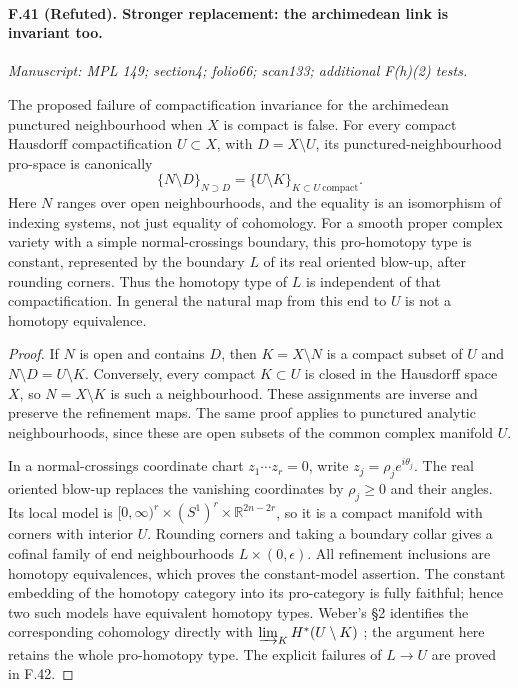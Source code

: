\paragraph{F.41 (Refuted). Stronger replacement: the archimedean link is invariant too.}
\textit{Manuscript: MPL 149; section4; folio66; scan133; additional F(h)(2) tests.}

The proposed failure of compactification invariance for the archimedean
punctured neighbourhood when $X$ is compact is false. For every compact
Hausdorff compactification $U\subset X$, with $D=X\setminus U$, its
punctured-neighbourhood pro-space is canonically
\[
 \{N\setminus D\}_{N\supset D}
       =\{U\setminus K\}_{K\subset U\ \mathrm{compact}}.
\]
Here $N$ ranges over open neighbourhoods, and the equality is an
isomorphism of indexing systems, not just equality of cohomology.
For a smooth proper complex variety with a simple normal-crossings
boundary, this pro-homotopy type is constant, represented by the boundary
$L$ of its real oriented blow-up, after rounding corners. Thus the
homotopy type of $L$ is independent of that compactification. In general
the natural map from this end to $U$ is not a homotopy equivalence.

\begin{proof}
If $N$ is open and contains $D$, then $K=X\setminus N$ is a compact
subset of $U$ and $N\setminus D=U\setminus K$. Conversely, every compact
$K\subset U$ is closed in the Hausdorff space $X$, so $N=X\setminus K$
is such a neighbourhood. These assignments are inverse and preserve the
refinement maps. The same proof applies to punctured analytic
neighbourhoods, since these are open subsets of the common complex
manifold $U$.

In a normal-crossings coordinate chart $z_1\cdots z_r=0$, write
$z_j=\rho_j e^{i\theta_j}$. The real oriented blow-up replaces the
vanishing coordinates by $\rho_j\geq0$ and their angles. Its local model
is $[0,\infty)^r\times(S^1)^r\times\mathbb R^{2n-2r}$, so it is a
compact manifold with corners with interior $U$. Rounding corners and
taking a boundary collar gives a cofinal family of end neighbourhoods
$L\times(0,\epsilon)$. All refinement inclusions are homotopy
equivalences, which proves the constant-model assertion. The constant
embedding of the homotopy category into its pro-category is fully
faithful; hence two such models have equivalent homotopy types. Weber's
\S2 identifies the corresponding cohomology directly with
$\varinjlim_K H^*(U\setminus K)$ \cite{Weber2012}; the argument here
retains the whole pro-homotopy type. The explicit failures of $L\to U$
are proved in F.42.
\end{proof}

